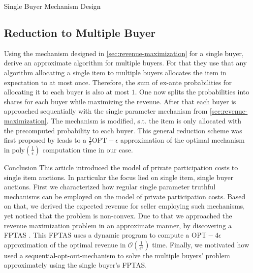 \documentclass[11pt,a4paper]{article}
\newcommand{\1}[1]{\mbox{\rm\bf 1}_{#1}}
\begin{document}
\begin{section}{Single Buyer Mechanism Design}
 \subsection{Reduction to Multiple Buyer}
 Using the mechanism designed in \autoref{sec:revenue-maximization} for a single buyer, \citet{primary} derive an approximate algorithm for multiple buyers.
 For that they use that any algorithm allocating a single item to multiple buyers allocates the item in expectation to at most once.
 Therefore, the sum of ex-ante probabilities for allocating it to each buyer is also at most $1$.
 One now splits the probabilities into shares for each buyer while maximizing the revenue.
 After that each buyer is approached sequentially with the single parameter mechanism from \autoref{sec:revenue-maximization}.
 The mechanism is modified, s.t. the item is only allocated with the precomputed probability to each buyer.
 This general reduction scheme was first proposed by \citet{alaei2012bayesian,alaei2014bayesian} leads to a $\frac{1}{2}\mathrm{OPT} - \epsilon$ approximation of the optimal mechanism in $\mathrm{poly}\left(\frac{1}{\epsilon}\right)$ computation time in our case.
\end{section}

\begin{section}{Conclusion}
 This article introduced the model of private participation costs to single item auctions.
 In particular the focus lied on single item, single buyer auctions.
 First we characterized how regular single parameter truthful mechanisms can be employed on the model of private participation costs.
 Based on that, we derived the expected revenue for seller employing such mechanisms, yet noticed that the problem is non-convex.
 Due to that we approached the revenue maximization problem in an approximate manner, by discovering a FPTAS \cite{primary}.
 This FPTAS uses a dynamic program to compute a $\mathrm{OPT}-4\epsilon$ approximation of the optimal revenue in $\mathcal{O}\left(\frac{1}{\epsilon^5}\right)$ time.
 Finally, we motivated how \citet{primary} used a sequential-opt-out-mechanism to solve the multiple buyers' problem approximately using the single buyer's FPTAS.
\end{section}

\end{document}
